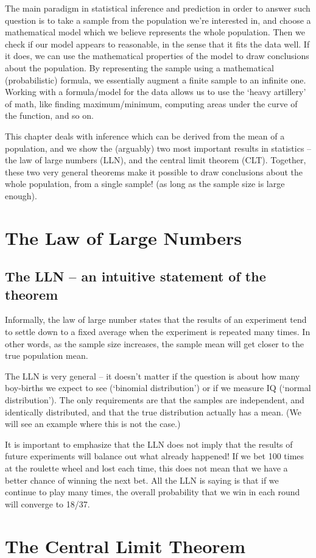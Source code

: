 The main paradigm in statistical inference and prediction in order to answer such question is to take a sample from the population we're interested in, and choose a mathematical model which we believe represents the whole population. Then we check if our model appears to reasonable, in the sense that it fits the data well. If it does, we can use the mathematical properties of the model to draw conclusions about the population. By representing the sample using a mathematical (probabilistic) formula, we essentially augment a finite sample to an infinite one. Working with a formula/model for the data allows us to use the `heavy artillery' of math, like finding maximum/minimum, computing areas under the curve of the function, and so on. 

This chapter deals with inference which can be derived from the mean of a population, and we show the (arguably) two most important results in statistics -- the law of large numbers (LLN), and the central limit theorem (CLT). Together, these two very general theorems make it possible to draw conclusions about the whole population, from a single sample! (as long as the sample size is large enough).


\section{The Law of Large Numbers}







\subsection{The LLN -- an intuitive statement of the theorem}
Informally, the law of large number states that the results of an experiment tend to settle down to a fixed average when the experiment is repeated many times. In other words, as the sample size increases, the sample mean will get closer to the true population mean.

The LLN is very general -- it doesn't matter if the question is about how many boy-births we expect to see (`binomial distribution') or if we measure IQ (`normal distribution'). The only requirements are that the samples are independent, and identically distributed, and that the true distribution actually has a mean. (We will see an example where this is not the case.)

It is important to emphasize that the LLN does not imply that the results of future experiments will balance out what already happened! If we bet 100 times at the roulette wheel and lost each time, this does not mean that we have a better chance of winning the next bet. All the LLN is saying is that if we continue to play many times, the overall probability that we win in each round will converge to 18/37.


\section{The Central Limit Theorem}
